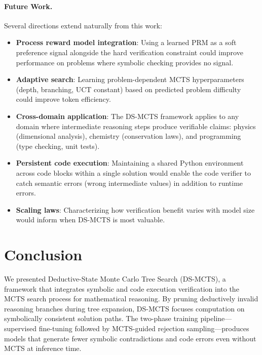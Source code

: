 \documentclass[11pt,a4paper]{article}
\begin{document}
\paragraph{Future Work.}

Several directions extend naturally from this work:

\begin{itemize}[nosep]
    \item \textbf{Process reward model integration}: Using a learned PRM as a
    soft preference signal alongside the hard verification constraint could
    improve performance on problems where symbolic checking provides no signal.

    \item \textbf{Adaptive search}: Learning problem-dependent MCTS
    hyperparameters (depth, branching, UCT constant) based on predicted problem
    difficulty could improve token efficiency.

    \item \textbf{Cross-domain application}: The DS-MCTS framework applies to
    any domain where intermediate reasoning steps produce verifiable claims:
    physics (dimensional analysis), chemistry (conservation laws), and
    programming (type checking, unit tests).

    \item \textbf{Persistent code execution}: Maintaining a shared Python
    environment across code blocks within a single solution would enable the
    code verifier to catch semantic errors (wrong intermediate values) in
    addition to runtime errors.

    \item \textbf{Scaling laws}: Characterizing how verification benefit varies
    with model size would inform when DS-MCTS is most valuable.
\end{itemize}


\section{Conclusion}
\label{sec:conclusion}

We presented Deductive-State Monte Carlo Tree Search (DS-MCTS), a framework
that integrates symbolic and code execution verification into the MCTS search
process for mathematical reasoning. By pruning deductively invalid reasoning
branches during tree expansion, DS-MCTS focuses computation on symbolically
consistent solution paths. The two-phase training pipeline---supervised
fine-tuning followed by MCTS-guided rejection sampling---produces models that
generate fewer symbolic contradictions and code errors even without MCTS at
inference time.
\end{document}
